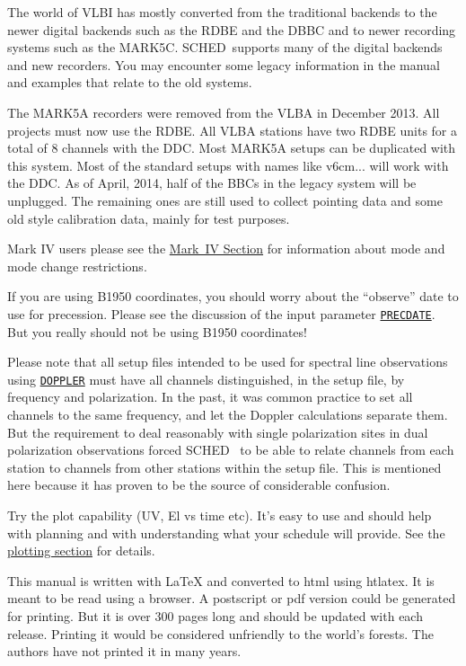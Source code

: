 \documentclass{report}
\newcommand{\schedb}{{\sc SCHED~}}
\begin{document}
\begin{list}{}{\parsep 0.5em \itemsep 0.5em }

\item The world of VLBI has mostly converted from the traditional
backends to the newer digital backends such as the RDBE and the DBBC
and to newer recording systems such as the MARK5C.  \schedb supports
many of the digital backends and new recorders.  You may encounter
some legacy information in the manual and examples that relate to
the old systems.  

\item The MARK5A recorders were removed from the VLBA in December
2013.  All projects must now use the RDBE.  All VLBA stations have
two RDBE units for a total of 8 channels with the DDC.  Most MARK5A
setups can be duplicated with this system.  Most of the standard 
setups with names like v6cm... will work with the DDC.  As of April,
2014, half of the BBCs in the legacy system will be unplugged.  The
remaining ones are still used to collect pointing data and some old
style calibration data, mainly for test purposes.

\item Mark IV users please see the 
{\hyperref[SSEC:MKIV]{Mark~IV Section}}
for information about mode and mode change restrictions.

\item If you are using B1950 coordinates, you should worry
about the ``observe'' date to use for precession.  Please see the
discussion of the input parameter 
{\hyperref[MP:PRECDATE]{{\tt PRECDATE}}}.
But you really should not be using B1950 coordinates!

\item Please note that all setup files intended to be used for
spectral line observations using 
{\hyperref[MP:DOPPLER]{{\tt DOPPLER}}}
must have all channels distinguished, in the setup file, by frequency
and polarization.  In the past, it was common practice to set all
channels to the same frequency, and let the Doppler calculations
separate them.  But the requirement to deal reasonably with single
polarization sites in dual polarization observations forced \schedb
to be able to relate channels from each station to channels from
other stations within the setup file.  This is mentioned here because
it has proven to be the source of considerable confusion.

\item Try the plot capability (UV, El vs time etc).  It's easy to
use and should help with planning and with understanding what your
schedule will provide.  See the 
{\hyperref[SEC:PLOT]{plotting section}}
for details.

\item This manual is written with LaTeX and converted to html using
htlatex.  It is meant to be read using a browser.  A postscript or pdf
version could be generated for printing.  But it is over 300 pages
long and should be updated with each release.  Printing it would be
considered unfriendly to the world's forests.  The authors have not
printed it in many years.

\end{list}
\end{document}
